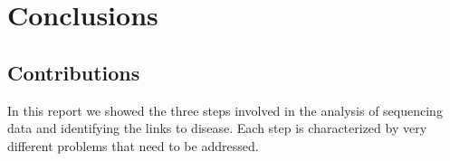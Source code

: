 
\chapter{Conclusions \label{ch:concl}}

\section{Contributions}

In this report we showed the three steps involved in the analysis of sequencing data and identifying the links to disease. Each step is characterized by very different problems that need to be addressed.
					
